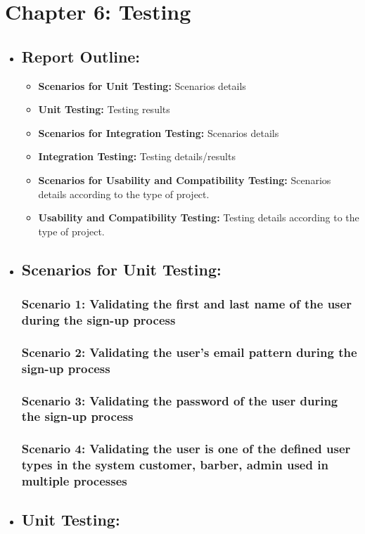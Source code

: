 \documentclass{article}
\begin{document}
\section{Chapter 6: Testing}
\begin{itemize}
\item \subsection{Report Outline:}
\begin{itemize}
    \item \textbf{Scenarios for Unit Testing:} Scenarios details

    \item \textbf{Unit Testing:} Testing results
    
    \item \textbf{Scenarios for Integration Testing:} Scenarios details
    
    \item \textbf{Integration Testing:} Testing details/results
    
    \item \textbf{Scenarios for Usability and Compatibility Testing:} Scenarios details according to the type of project.
    \item \textbf{Usability and Compatibility Testing:} Testing details according to the type of project.
\end{itemize}
\newpage
\item \subsection{Scenarios for Unit Testing:}
\subsubsection{\label{sec:scenario1} Scenario 1: Validating the first and last name of the user during the sign-up process}
\subsubsection{\label{sec:scenario2} Scenario 2: Validating the user's email pattern during the sign-up process}
\subsubsection{\label{sec:scenario3} Scenario 3: Validating the password of the user during the sign-up process}
\subsubsection{\label{sec:scenario4} Scenario 4: Validating the user is one of the defined user types in the system {customer, barber, admin} used in multiple processes}
\newpage
\item \subsection{Unit Testing:}

\end{itemize}
\end{document}
